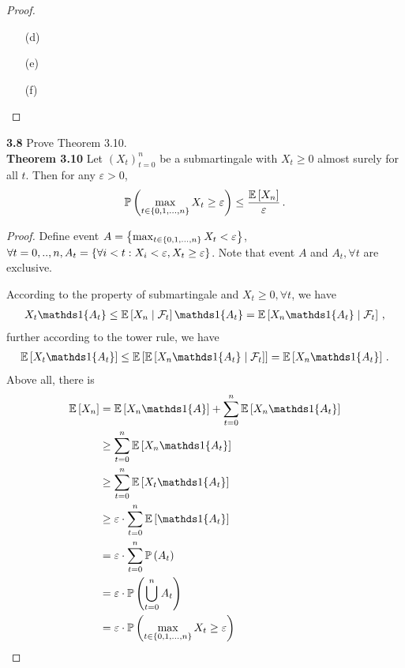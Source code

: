 \begin{proof}
\begin{enumerate}
   \item[(d)] 
   \item[(e)] 
   \item[(f)]
\end{enumerate}


\end{proof}






\noindent\textbf{3.8} Prove Theorem 3.10.\\
\textbf{Theorem 3.10}
  Let $(X_t)_{t=0}^n$ be a submartingale with $X_t\ge 0$ almost surely for all $t$. Then for any $\varepsilon>0$,
  \begin{align*}
      \mathbb{P} \left(\max_{t\in\left\{ 0,1,...,n \right\}}X_t \ge \varepsilon\right) \le \frac{\mathbb{E} \left[X_n\right]}{\varepsilon}\,.
  \end{align*}

\begin{proof}
  Define event $A=\left\{ \max_{t\in\left\{ 0,1,...,n \right\}} X_t<\varepsilon  \right\}$, $\forall t=0,..,n, A_t=\left\{ \forall i<t: X_i<\varepsilon , X_t \ge \varepsilon \right\}$. Note that event $A$ and $A_t,\forall t$ are exclusive. 

  According to the property of submartingale and $X_t\ge 0, \forall t$, we have
  \begin{align*}
    X_t \bOne{A_t} \le \EE{X_n \mid \cF_{t}}  \bOne{A_t} = \EE{X_n \bOne{A_t}\mid \cF_{t}}  \,,
  \end{align*}
  further according to the tower rule, we have
  \begin{align*}
   \EE{X_t \bOne{A_t}} \le \EE{\EE{X_n \bOne{A_t}\mid \cF_{t}}}  = \EE{X_n \bOne{A_t}} \,.
  \end{align*}
  Above all, there is
  \begin{align}
     \EE{X_n} &= \EE{X_n\bOne{A}}+\sum_{t=0}^n\EE{X_n\bOne{A_t}} \notag \\
      &\ge \sum_{t=0}^n\EE{X_n\bOne{A_t}}\notag\\
      &\ge \sum_{t=0}^n\EE{X_t\bOne{A_t}}\notag\\
      &\ge \varepsilon\cdot \sum_{t=0}^n\EE{\bOne{A_t}}\notag\\
      &= \varepsilon\cdot \sum_{t=0}^n \PP{A_t} \notag\\
      &= \varepsilon \cdot\PP{\bigcup_{t=0}^n A_t}\notag\\
      &= \varepsilon\cdot \PP{\max_{t\in\set{0,1,...,n}}X_t \ge \varepsilon}\notag
  \end{align}
\end{proof}












